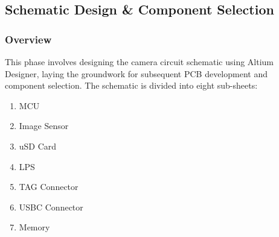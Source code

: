 \documentclass[10pt]{article}
\newcommand{\nl}{\newline \newline}
\begin{document}
\subsection{Schematic Design \& Component Selection}

\subsubsection{Overview}
This phase involves designing the camera circuit schematic using Altium Designer, laying the groundwork for subsequent PCB development and component selection.
\nl
The schematic is divided into eight sub-sheets:
\begin{enumerate}[noitemsep]
    \item MCU
    \item Image Sensor
    \item uSD Card
    \item LPS
    \item TAG Connector
    \item USBC Connector
    \item Memory
\end{enumerate}
\end{document}
